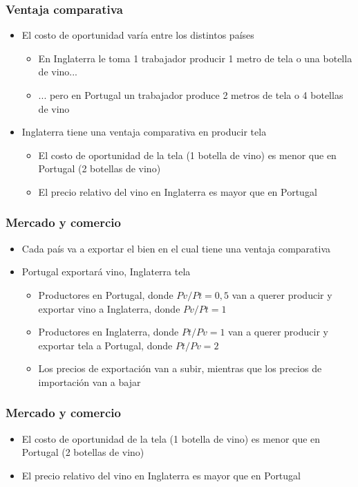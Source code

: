 \documentclass{beamer}
\begin{document}
\begin{frame}
\frametitle{ Ventaja comparativa}
\begin{itemize}
    \item El costo de oportunidad varía entre los distintos países
    \begin{itemize}
        \item En Inglaterra le toma 1 trabajador producir 1 metro de tela o una botella de vino...
        \item ... pero en Portugal un trabajador produce 2 metros de tela o 4 botellas de vino
    \end{itemize}
    \item Inglaterra tiene una ventaja comparativa en producir tela
    \begin{itemize}
        \item El costo de oportunidad de la tela (1 botella de vino) es menor que en Portugal (2 botellas de vino)
        \item El precio relativo del vino en Inglaterra es mayor que en Portugal
    \end{itemize}
\end{itemize}
\end{frame}

\begin{frame}
\frametitle{Mercado y comercio}
\begin{itemize}
    \item Cada país va a exportar el bien en el cual tiene una ventaja comparativa
    \item Portugal exportará vino, Inglaterra tela
        \begin{itemize}
        \item Productores en Portugal, donde $Pv/Pt = 0,5$ van a querer producir y exportar vino a Inglaterra, donde $Pv/Pt = 1$
        \item Productores en Inglaterra, donde $Pt/Pv = 1$ van a querer producir y exportar tela a Portugal, donde $Pt/Pv = 2$
        \item Los precios de exportación van a subir, mientras que los precios de importación van a bajar
        \end{itemize}
\end{itemize}
\end{frame}

\begin{frame}
\frametitle{Mercado y comercio}
\begin{itemize}
    \item El costo de oportunidad de la tela (1 botella de vino) es menor que en Portugal (2 botellas de vino)
    \item El precio relativo del vino en Inglaterra es mayor que en Portugal
\end{itemize}
\end{frame}
\end{document}
